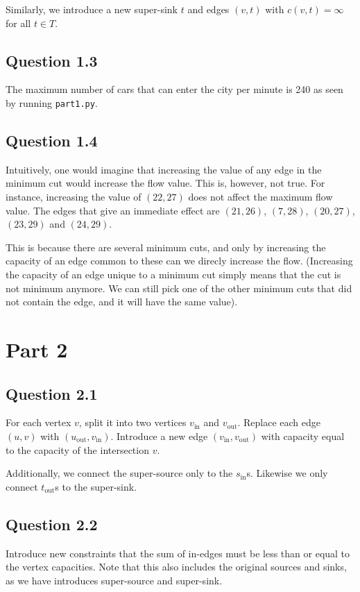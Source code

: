 \documentclass{sig-alternate}
\begin{document}
Similarly, we introduce a new super-sink $t$ and edges $(v, t)$ with
$c(v,t)=\infty$ for all $t \in T$.


\subsection*{Question 1.3}

The maximum number of cars that can enter the city per minute is 240 as seen
by running \verb+part1.py+.

\subsection*{Question 1.4}

Intuitively, one would imagine that increasing the value of any edge in the
minimum cut would increase the flow value. This is, however, not true. For
instance, increasing the value of $(22, 27)$ does not affect the maximum flow
value. The edges that give an immediate effect are $(21, 26)$, $(7, 28)$,
$(20, 27)$, $(23, 29)$ and $(24, 29)$.

This is because there are several minimum cuts, and only by increasing the
capacity of an edge common to these can we direcly increase the flow.
(Increasing the capacity of an edge unique to a minimum cut simply means that
the cut is not minimum anymore. We can still pick one of the other minimum cuts
that did not contain the edge, and it will have the same value).


\section{Part 2}
\subsection*{Question 2.1}\label{sec:2.1}
For each vertex $v$, split it into two vertices $v_{\text{in}}$ and
$v_{\text{out}}$. Replace each edge $(u, v)$ with $(u_{\text{out}},
v_{\text{in}})$. Introduce a new edge $(v_{\text{in}}, v_{\text{out}})$ with
capacity equal to the capacity of the intersection $v$.

Additionally, we connect the super-source only to the $s_{\text{in}}$s.
Likewise we only connect $t_{\text{out}}$s to the super-sink.

\subsection*{Question 2.2}
Introduce new constraints that the sum of in-edges must be less than or equal
to the vertex capacities. Note that this also includes the original sources and
sinks, as we have introduces super-source and super-sink.
\end{document}
